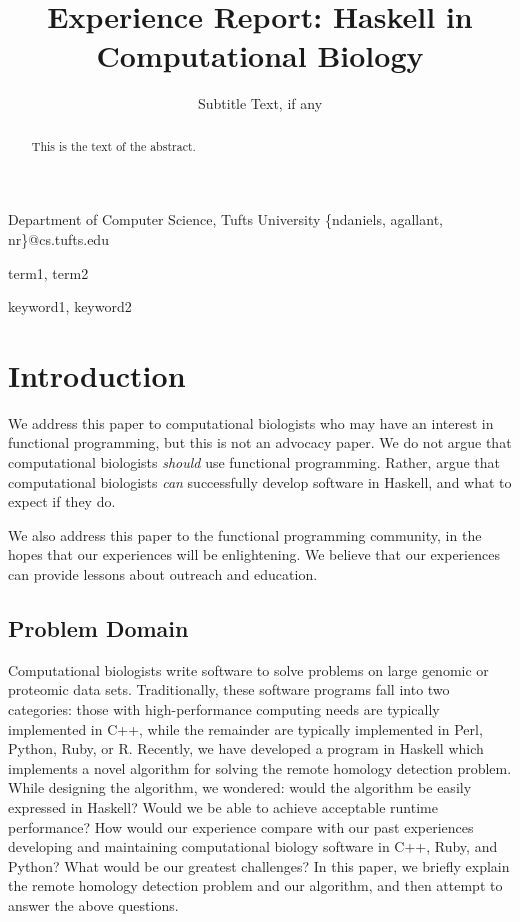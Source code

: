 \documentclass[preprint]{sigplanconf}
\begin{document}
\copyrightdata{[to be supplied]} 


\title{Experience Report: Haskell in Computational Biology}
\subtitle{Subtitle Text, if any}

           {Department of Computer Science, Tufts University}
           {\{ndaniels, agallant, nr\}@cs.tufts.edu}


\maketitle

\begin{abstract}
This is the text of the abstract.
\end{abstract}


\terms
term1, term2

\keywords
keyword1, keyword2

\section{Introduction}

We address this paper to computational biologists who may have an interest in 
functional programming, but this is not an advocacy paper. We do not argue that 
computational biologists \textit{should} use functional programming. Rather, 
argue that computational biologists \textit{can} successfully develop software 
in Haskell, and what to expect if they do.

We also address this paper to the functional programming community, in the 
hopes that our experiences will be enlightening. We believe that our 
experiences can provide lessons about outreach and education.


\subsection{Problem Domain}

Computational biologists write software to solve problems on large genomic or 
proteomic data sets. Traditionally, these software programs fall into two 
categories: those with high-performance computing needs are typically 
implemented in C++, while the remainder are typically implemented in Perl, 
Python, Ruby, or R. Recently, we have developed a program in Haskell which 
implements a novel algorithm for solving the remote homology detection problem. 
While designing the algorithm, we wondered: would the algorithm be easily 
expressed in Haskell? Would we be able to achieve acceptable runtime 
performance? How would our experience compare with our past experiences 
developing and maintaining computational biology software in C++, Ruby, and 
Python? What would be our greatest challenges? In this paper, we briefly 
explain the remote homology detection problem and our algorithm, and then 
attempt to answer the above questions.
\end{document}
